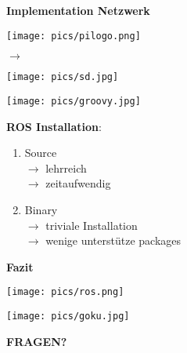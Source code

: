 \documentclass{beamer}
\begin{document}
\begin{frame}
{\bf Implementation Netzwerk}
\parbox{5cm}{\texttt{[image: pics/pilogo.png]}}
$\rightarrow$
\parbox{5cm}{\texttt{[image: pics/sd.jpg]}}
\end{frame}


\begin{frame}
\centerline{\texttt{[image: pics/groovy.jpg]}}
\end{frame}

\begin{frame}
{\bf ROS Installation}:
\begin{enumerate}
\item Source \\
$\rightarrow $ lehrreich \\
$\rightarrow $ zeitaufwendig \\
\item Binary \\
$\rightarrow $ triviale Installation \\
$\rightarrow $ wenige unterstütze packages \\
\end{enumerate}
\end{frame}

\begin{frame}
{\bf Fazit}
\centerline{\texttt{[image: pics/ros.png]}}
\end{frame}

\begin{frame}
\centerline{\texttt{[image: pics/goku.jpg]}}
\vspace{2cm}
\centerline{{\bf \Huge FRAGEN?}}
\end{frame}
\end{document}
